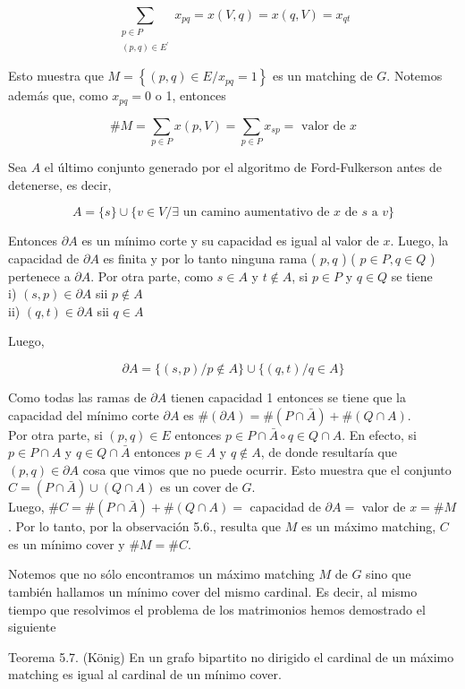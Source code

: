 \documentclass[10pt]{article}
\begin{document}
$$
\sum_{\substack{p \in P \\(p, q) \in E^{\prime}}} x_{p q}=x(V, q)=x(q, V)=x_{q t}
$$

Esto muestra que $M=\left\{(p, q) \in E / x_{p q}=1\right\}$ es un matching de $G$. Notemos además que, como $x_{p q}=0$ o 1, entonces

$$
\# M=\sum_{p \in P} x(p, V)=\sum_{p \in P} x_{s p}=\text { valor de } x
$$

Sea $A$ el último conjunto generado por el algoritmo de Ford-Fulkerson antes de detenerse, es decir,

$$
A=\{s\} \cup\{v \in V / \exists \text { un camino aumentativo de } x \text { de } s \text { a } v\}
$$

Entonces $\partial A$ es un mínimo corte y su capacidad es igual al valor de $x$. Luego, la capacidad de $\partial A$ es finita y por lo tanto ninguna rama ( $p, q$ ) ( $p \in P, q \in Q$ ) pertenece a $\partial A$. Por otra parte, como $s \in A$ y $t \notin A$, si $p \in P$ y $q \in Q$ se tiene\\
i) $(s, p) \in \partial A$ sii $p \notin A$\\
ii) $(q, t) \in \partial A$ sii $q \in A$

Luego,

$$
\partial A=\{(s, p) / p \notin A\} \cup\{(q, t) / q \in A\}
$$

Como todas las ramas de $\partial A$ tienen capacidad 1 entonces se tiene que la capacidad del mínimo corte $\partial A$ es $\#(\partial A)=\#(P \cap \bar{A})+\#(Q \cap A)$.\\
Por otra parte, si $(p, q) \in E$ entonces $p \in P \cap \bar{A} \circ q \in Q \cap A$. En efecto, si $p \in P \cap A$ y $q \in Q \cap \bar{A}$ entonces $p \in A$ y $q \notin A$, de donde resultaría que $(p, q) \in \partial A$ cosa que vimos que no puede ocurrir. Esto muestra que el conjunto $C=(P \cap \bar{A}) \cup(Q \cap A)$ es un cover de $G$.\\
Luego, $\# C=\#(P \cap \bar{A})+\#(Q \cap A)=$ capacidad de $\partial A=$ valor de $x=\# M$. Por lo tanto, por la observación 5.6., resulta que $M$ es un máximo matching, $C$ es un mínimo cover y $\# M=\# C$.

Notemos que no sólo encontramos un máximo matching $M$ de $G$ sino que también hallamos un mínimo cover del mismo cardinal. Es decir, al mismo tiempo que resolvimos el problema de los matrimonios hemos demostrado el siguiente

Teorema 5.7. (König) En un grafo bipartito no dirigido el cardinal de un máximo matching es igual al cardinal de un mínimo cover.
\end{document}
